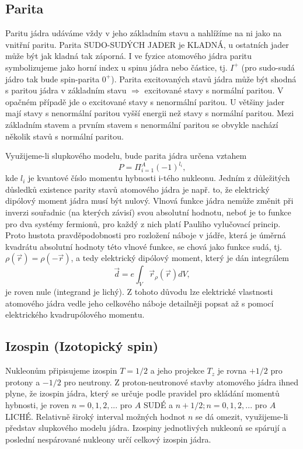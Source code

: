 \documentclass[../../main.tex]{subfiles}
\begin{document}
\subsection{Parita}

Paritu jádra udáváme vždy v jeho základním stavu a nahlížíme na ni jako na vnitřní paritu. Parita SUDO-SUDÝCH JADER je KLADNÁ, u ostatních jader může být jak kladná tak záporná. I ve fyzice atomového jádra paritu symbolizujeme jako horní index u spinu jádra nebo částice, tj. $I^+$ (pro sudo-sudá jádro tak bude spin-parita $0^+$). Parita excitovaných stavů jádra může být shodná s paritou jádra v základním stavu $\Rightarrow$ excitované stavy s normální paritou. V opačném případě jde o excitované stavy s nenormální paritou. U většiny jader mají stavy s nenormální paritou vyšší energii než stavy s normální paritou. Mezi základním stavem a prvním stavem s nenormální paritou se obvykle nachází několik stavů s normální paritou. 

Využijeme-li slupkového modelu, bude parita jádra určena vztahem
\begin{equation}
P = \Pi _{i = 1} ^{A} (-1)^{l_i},
\end{equation}
kde $l_i$ je kvantové číslo momentu hybnosti i-tého nukleonu. Jedním z důležitých důsledků existence parity stavů atomového jádra je např. to, že elektrický dipólový moment jádra musí být nulový. Vlnová funkce jádra nemůže změnit při inverzi souřadnic  (na kterých závisí) svou absolutní hodnotu, neboť je to funkce pro dva systémy fermionů, pro každý z nich platí Pauliho vylučovací princip. Proto hustota pravděpodobnosti pro rozložení náboje v jádře, která je úměrná kvadrátu absolutní hodnoty této vlnové funkce, se chová jako funkce sudá, tj. $\rho (\vec{r}) = \rho (- \vec{r})$, a tedy elektrický dipólový moment, který je dán integrálem 
\begin{equation}
\vec{d} = e \int_V \vec{r}_{\rho} (\vec{r}) dV,
\end{equation}
je roven nule (integrand je lichý). Z tohoto důvodu lze elektrické vlastnosti atomového jádra vedle jeho celkového náboje detailněji popsat až s pomocí elektrického kvadrupólového momentu. 

\subsection{Izospin (Izotopický spin)}

Nukleonům připisujeme izospin $T = 1/2$ a jeho projekce $T_z$ je rovna $+ 1/2$ pro protony a $-1/2$ pro neutrony. Z proton-neutronové stavby atomového jádra ihned plyne, že izospin jádra, který se určuje podle pravidel pro skládání momentů hybnosti, je roven $n = 0, 1, 2, ...$ pro $A$ SUDÉ a $n + 1/2; n = 0, 1, 2, ...$ pro $A$ LICHÉ. Relativně široký interval možných hodnot $n$ se dá omezit, využijeme-li představ slupkového modelu jádra. Izospiny jednotlivých nukleonů se spárují a poslední nespárované nukleony určí celkový izospin jádra. 
\end{document}
